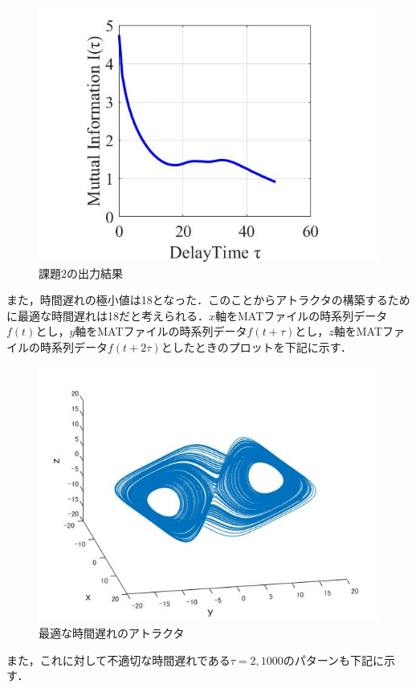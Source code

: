 \documentclass[autodetect-engine,dvipdfmx-if-dvi,ja=standard,a4paper,11pt]{bxjsarticle} %
\begin{document}
\begin{figure}[H]%
\begin{center}
\includegraphics[width=.4\textwidth]{kadai2_rusult.jpg}
\end{center}
\caption{課題2の出力結果}%
\label{fig:kadai2}
\end{figure}

また，時間遅れの極小値は18となった．このことからアトラクタの構築するために最適な時間遅れは18だと考えられる．$x$軸をMATファイルの時系列データ$f(t)$とし，$y$軸をMATファイルの時系列データ$f(t+\tau)$とし，$z$軸をMATファイルの時系列データ$f(t+2\tau)$としたときのプロットを下記に示す．

\begin{figure}[H]%
\begin{center}
\includegraphics[width=.4\textwidth]{kadai2_rusult2.jpg}
\end{center}
\caption{最適な時間遅れのアトラクタ}%
\label{fig:kadai22}
\end{figure}

また，これに対して不適切な時間遅れである$\tau=2,1000$のパターンも下記に示す．
\end{document}
